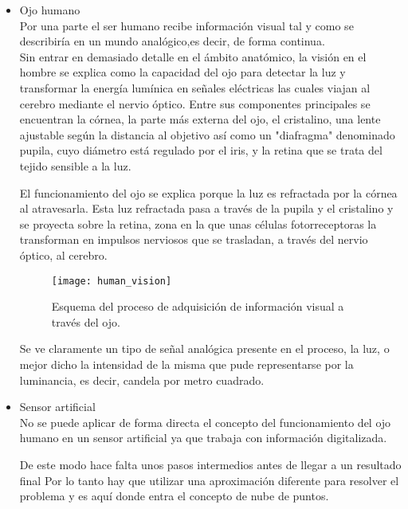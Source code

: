 \begin{itemize}
\item Ojo humano
\\
Por una parte el ser humano recibe información visual tal y como se describiría en un mundo analógico,es decir, de forma continua.
\\
Sin entrar en demasiado detalle en el ámbito anatómico, la visión en el hombre se explica como la capacidad del ojo para detectar la luz y transformar la energía lumínica en señales eléctricas las cuales viajan al cerebro mediante el nervio óptico. Entre sus componentes principales se encuentran la córnea, la parte más externa del ojo, el cristalino, una lente ajustable según la distancia al objetivo así como un "diafragma" denominado pupila, cuyo diámetro está regulado por el iris, y la retina que se trata del tejido sensible a la luz. 

El funcionamiento del ojo se explica porque la luz es refractada por la córnea al atravesarla. Esta luz refractada pasa a través de la pupila y el cristalino y se proyecta sobre la retina, zona en la que unas células fotorreceptoras la transforman en impulsos nerviosos que se trasladan, a través del nervio óptico, al cerebro.


\begin{figure}[!htb]
\centering
{}
  \texttt{[image: human\_vision]}
  \caption{Esquema del proceso de adquisición de información visual a través del ojo.}\label{fig:human_vision}
\endminipage\hfill
\end{figure}

Se ve claramente un tipo de señal analógica presente en el proceso, la luz, o mejor dicho la intensidad de la misma que pude representarse por la luminancia, es decir, candela por metro cuadrado.


\item Sensor artificial
\\
No se puede aplicar de forma directa el concepto del funcionamiento del ojo humano en un sensor artificial ya que trabaja con información digitalizada. 

De este modo hace falta unos pasos intermedios antes de llegar a un resultado final Por lo tanto hay que utilizar una aproximación diferente para resolver el problema y es aquí donde entra el concepto de nube de puntos. 
\end{itemize}

